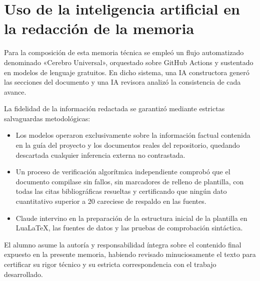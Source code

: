 \section{Uso de la inteligencia artificial en la redacción de la memoria}

Para la composición de esta memoria técnica se empleó un flujo automatizado denominado «Cerebro Universal», orquestado sobre GitHub Actions y sustentado en modelos de lenguaje gratuitos. En dicho sistema, una IA constructora generó las secciones del documento y una IA revisora analizó la consistencia de cada avance.

La fidelidad de la información redactada se garantizó mediante estrictas salvaguardas metodológicas:
\begin{itemize}
    \item Los modelos operaron exclusivamente sobre la información factual contenida en la guía del proyecto y los documentos reales del repositorio, quedando descartada cualquier inferencia externa no contrastada.
    \item Un proceso de verificación algorítmica independiente comprobó que el documento compilase sin fallos, sin marcadores de relleno de plantilla, con todas las citas bibliográficas resueltas y certificando que ningún dato cuantitativo superior a 20 careciese de respaldo en las fuentes.
    \item Claude intervino en la preparación de la estructura inicial de la plantilla en LuaLaTeX, las fuentes de datos y las pruebas de comprobación sintáctica.
\end{itemize}

El alumno asume la autoría y responsabilidad íntegra sobre el contenido final expuesto en la presente memoria, habiendo revisado minuciosamente el texto para certificar su rigor técnico y su estricta correspondencia con el trabajo desarrollado.
